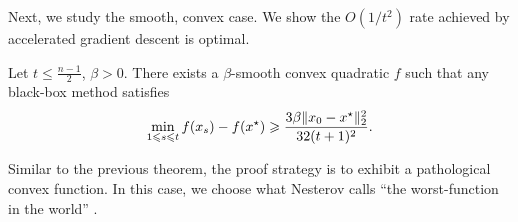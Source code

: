 Next, we study the smooth, convex case. We show the $O(1/t^2)$ rate achieved by
accelerated gradient descent is optimal.

\begin{theorem}[Smooth-$f$]\label{theorem:lb-smooth}
Let $t \leq \frac{n-1}{2}$, $\beta > 0$. There exists a $\beta$-smooth convex
quadratic $f$ such that any black-box method satisfies
\begin{align}
    \min_{1 \leqslant s \leqslant t} f(x_s) - f(x^\star)
    \geqslant \frac{3\beta \lVert x_0 - x^\star\rVert_2^2}{32(t+1)^2}.
\end{align}
\end{theorem}
Similar to the previous theorem, the proof strategy is to exhibit 
a pathological convex function. In this case, we choose what Nesterov calls
``the worst-function in the world'' \cite{nesterov04}.

